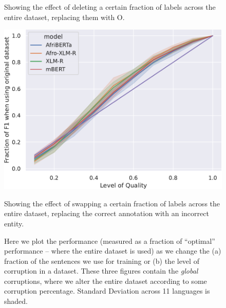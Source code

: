 \documentclass{article}
\begin{document}
\begin{figure}
\begin{minipage}[t]{0.33\linewidth}
        \caption{Showing the effect of deleting a certain fraction of labels across the entire dataset, replacing them with O.}
        \label{fig:global_cap_labels}
    \end{minipage}
    \begin{minipage}[t]{0.33\linewidth}
        \captionsetup{width=.8\linewidth}
        \centering
        \includegraphics[width=1\linewidth]{images/global_swap_labels.pdf}
        \caption{Showing the effect of swapping a certain fraction of labels across the entire dataset, replacing the correct annotation with an incorrect entity.}
        \label{fig:global_swap_labels}
    \end{minipage}
    \caption*{Here we plot the performance (measured as a fraction of ``optimal'' performance -- where the entire dataset is used) as we change the (a) fraction of the sentences we use for training or (b) the level of corruption in a dataset. These three figures contain the \textit{global} corruptions, where we alter the entire dataset according to some corruption percentage. Standard Deviation across 11 languages is shaded.}
\end{figure}
\end{document}
